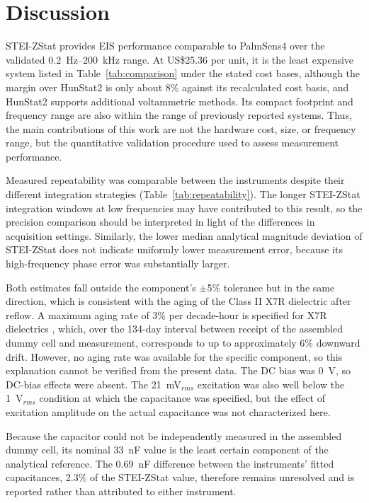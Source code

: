 \section{Discussion}
STEI-ZStat provides EIS performance comparable to PalmSens4 over the validated 0.2~Hz--200~kHz range. At US\$25.36 per unit, it is the least expensive system listed in Table~\ref{tab:comparison} under the stated cost bases, although the margin over HunStat2 \cite{vamos2025hunstat2} is only about 8\% against its recalculated cost basis, and HunStat2 supports additional voltammetric methods. Its compact footprint and frequency range are also within the range of previously reported systems. Thus, the main contributions of this work are not the hardware cost, size, or frequency range, but the quantitative validation procedure used to assess measurement performance.

Measured repeatability was comparable between the instruments despite their different integration strategies (Table~\ref{tab:repeatability}). The longer STEI-ZStat integration windows at low frequencies may have contributed to this result, so the precision comparison should be interpreted in light of the differences in acquisition settings. Similarly, the lower median analytical magnitude deviation of STEI-ZStat does not indicate uniformly lower measurement error, because its high-frequency phase error was substantially larger.

Both estimates fall outside the component's $\pm$5\% tolerance but in the same direction, which is consistent with the aging of the Class II X7R dielectric after reflow. A maximum aging rate of 3\% per decade-hour is specified for X7R dielectrics \cite{kemet2025cots}, which, over the 134-day interval between receipt of the assembled dummy cell and measurement, corresponds to up to approximately 6\% downward drift. However, no aging rate was available for the specific component, so this explanation cannot be verified from the present data. The DC bias was 0~V, so DC-bias effects were absent. The 21~mV$_{rms}$ excitation was also well below the 1~V$_{rms}$ condition at which the capacitance was specified, but the effect of excitation amplitude on the actual capacitance was not characterized here.

Because the capacitor could not be independently measured in the assembled dummy cell, its nominal 33~nF value is the least certain component of the analytical reference. The 0.69~nF difference between the instruments' fitted capacitances, 2.3\% of the STEI-ZStat value, therefore remains unresolved and is reported rather than attributed to either instrument.

